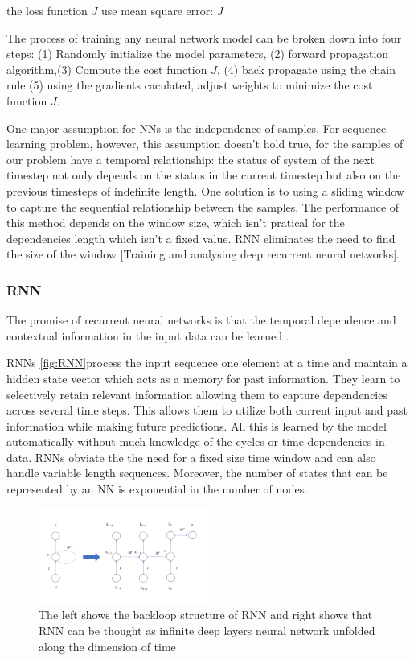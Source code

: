 \documentclass[5p]{elsarticle}
\begin{document}
the loss function $J$ use mean square error:
    $J$

The process of training any neural network model can be broken down into four steps: (1) Randomly initialize the model parameters, (2) forward propagation algorithm,(3) Compute the cost function $J$, (4) back propagate using the chain rule  (5) using the gradients caculated, adjust weights to minimize the cost function $J$.

One major assumption for NNs is the independence of samples. For sequence learning problem, however, this assumption doesn't hold true, for the samples of our problem have a temporal relationship: the status of system of the next timestep not only depends on the status in the current timestep but also on the previous timesteps of indefinite length. One solution is to using a sliding window to capture the sequential relationship between the samples. The performance of this method depends on the window size, which isn't pratical for the dependencies length which isn't a fixed value. RNN eliminates the need to find the size of the window [Training and analysing deep recurrent neural networks]. 

\subsubsection{RNN}
The promise of recurrent neural networks is that the temporal dependence and contextual
information in the input data can be learned\cite{Bengio1994LearningDifficult} \cite{ChoLearningTranslation}. 

RNNs \ref{fig:RNN}process the input sequence one element at a time and maintain a hidden
state vector which acts as a memory for past information. They learn to selectively retain relevant information allowing them to capture dependencies across several time steps. This allows them to utilize both current input and past information while making future predictions. All this is learned by the model automatically without much knowledge of the cycles or time dependencies in data. RNNs obviate the the need for a fixed size time window and can also handle variable length sequences. Moreover, the number of states that can be represented by an NN is exponential in the number of nodes.

 
\begin{figure}[h]
    \centering
    \includegraphics[width=0.5\textwidth]{RNN.png}
    \caption{The left shows the backloop structure of RNN and right shows that RNN can be thought as infinite deep layers neural network unfolded along the dimension of time}
    \label{fig:RNN can be thought as infinite deep layers neural network along the dimensions of time}
\end{figure}
\end{document}
